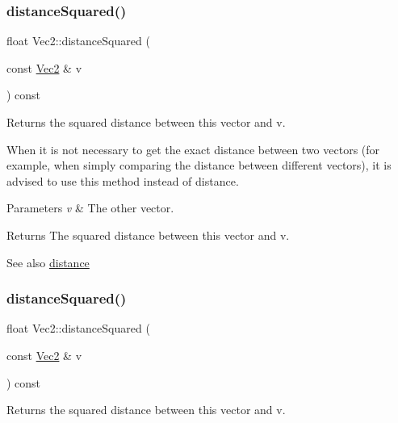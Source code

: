 \subsubsection{\texorpdfstring{distance\+Squared()}{distanceSquared()}\hspace{0.1cm}{\footnotesize\ttfamily [1/2]}}
{\footnotesize\ttfamily float Vec2\+::distance\+Squared (\begin{DoxyParamCaption}\item[{const \hyperlink{classVec2}{Vec2} \&}]{v }\end{DoxyParamCaption}) const\hspace{0.3cm}{\ttfamily [inline]}}

Returns the squared distance between this vector and v.

When it is not necessary to get the exact distance between two vectors (for example, when simply comparing the distance between different vectors), it is advised to use this method instead of distance.


\begin{DoxyParams}{Parameters}
{\em v} & The other vector.\\
\hline
\end{DoxyParams}
\begin{DoxyReturn}{Returns}
The squared distance between this vector and v.
\end{DoxyReturn}
\begin{DoxySeeAlso}{See also}
\hyperlink{classVec2_a95cf4ec6593042a5c19186828f53d146}{distance} 
\end{DoxySeeAlso}
\mbox{\label{classVec2_a5bf11958886ffb9d406a7d4e7eae4237}} 
\subsubsection{\texorpdfstring{distance\+Squared()}{distanceSquared()}\hspace{0.1cm}{\footnotesize\ttfamily [2/2]}}
{\footnotesize\ttfamily float Vec2\+::distance\+Squared (\begin{DoxyParamCaption}\item[{const \hyperlink{classVec2}{Vec2} \&}]{v }\end{DoxyParamCaption}) const\hspace{0.3cm}{\ttfamily [inline]}}

Returns the squared distance between this vector and v.

